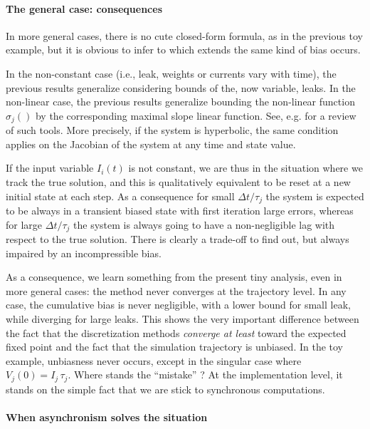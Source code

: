 \paragraph*{The general case: consequences}

In more general cases, there is no cute closed-form formula, as in the previous toy example, but it is obvious to infer to which extends the same kind of bias occurs.

In the non-constant case (i.e., leak, weights or currents vary with time), the previous results generalize considering bounds of the, now variable, leaks. 
In the non-linear case, the previous results generalize bounding the non-linear function $\sigma_j()$ by the corresponding maximal slope linear function.
See, e.g. \cite{Cessac:2007} for a review of such tools.
More precisely, if the system is hyperbolic, the same condition applies on the Jacobian of the system at any time and state value.

If the input variable $I_i(t)$ is not constant, we are thus in the situation where we track the true solution, and this is qualitatively equivalent to be reset at a new initial state at each step. As a consequence for small $\Delta t / \tau_j$ the system is expected to be always in a transient biased state with first iteration large errors, whereas for large  $\Delta t / \tau_j$ the system is always going to have a non-negligible lag with respect to the true solution. There is clearly a trade-off to find out, but always impaired by an incompressible bias.

As a consequence, we learn something from the present tiny analysis, even in more general cases: the method never converges at the trajectory level.
In any case, the cumulative bias is never negligible, with a lower bound for small leak, while diverging for large leaks.
This shows the very important difference between the fact that the discretization methods {\em converge at least} toward the expected fixed point 
and the fact that the simulation trajectory is unbiased. In the toy example, unbiasness never occurs, except in the singular case where $V_j(0) = I_j \, \tau_j$. Where stands the ``mistake'' ? At the implementation level, it stands on the simple fact that we are stick to synchronous computations.

\paragraph*{When asynchronism solves the situation}

